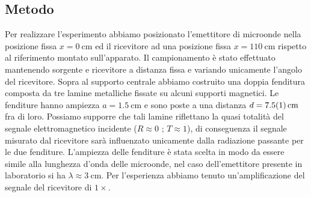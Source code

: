 \documentclass[a4paper]{article}
\begin{document}
\subsection{Metodo}
Per realizzare l'esperimento abbiamo posizionato l'emettitore di microonde nella posizione fissa $x=\SI{0}{\centi\metre}$ ed il ricevitore ad una posizione fissa $x=\SI{110}{\centi\metre}$ rispetto al riferimento montato sull'apparato. Il campionamento è stato effettuato mantenendo sorgente e ricevitore a distanza fissa e variando unicamente l'angolo del ricevitore. Sopra al supporto centrale abbiamo costruito una doppia fenditura composta da tre lamine metalliche fissate su alcuni supporti magnetici. Le fenditure hanno ampiezza $a=\SI{1.5}{\centi\metre}$ e sono poste a una distanza $d=\SI{7.5 \pm 0.1}{\centi\metre}$ fra di loro. Possiamo supporre che tali lamine riflettano la quasi totalità del segnale elettromagnetico incidente ($R\approx0$ ; $T\approx1$), di conseguenza il segnale misurato dal ricevitore sarà influenzato unicamente dalla radiazione passante per le due fenditure. L'ampiezza delle fenditure è stata scelta in modo da essere simile alla lunghezza d'onda delle microonde, nel caso dell'emettitore presente in laboratorio si ha $\lambda \approx \SI{3}{\centi\metre}$.
Per l'esperienza abbiamo tenuto un'amplificazione del segnale del ricevitore di $1\times$.
\end{document}
